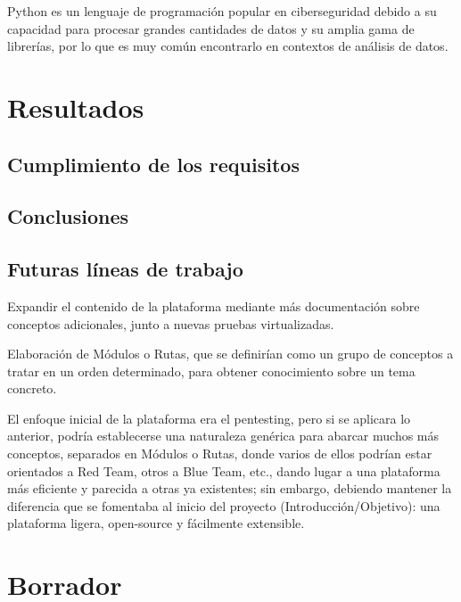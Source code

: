             Python es un lenguaje de programación popular en ciberseguridad debido a su capacidad para procesar grandes cantidades de datos y su amplia gama de librerías, por lo que es muy común encontrarlo en contextos de análisis de datos.
            
            \cleardoublepage



\chapter{Resultados}

    \section{Cumplimiento de los requisitos}
    
    \section{Conclusiones}
    
    \section{Futuras líneas de trabajo}
        \label{sec:futuras-lineas-trabajo}
        
        Expandir el contenido de la plataforma mediante más documentación sobre conceptos adicionales, junto a nuevas pruebas virtualizadas.
        
        Elaboración de Módulos o Rutas, que se definirían como un grupo de conceptos a tratar en un orden determinado, para obtener conocimiento sobre un tema concreto.
        
        El enfoque inicial de la plataforma era el pentesting, pero si se aplicara lo anterior, podría establecerse una naturaleza genérica para abarcar muchos más conceptos, separados en Módulos o Rutas, donde varios de ellos podrían estar orientados a Red Team, otros a Blue Team, etc., dando lugar a una plataforma más eficiente y parecida a otras ya existentes; sin embargo, debiendo mantener la diferencia que se fomentaba al inicio del proyecto (Introducción/Objetivo): una plataforma ligera, open-source y fácilmente extensible.
    



\chapter{Borrador}
    \label{cha:borrador}
    

